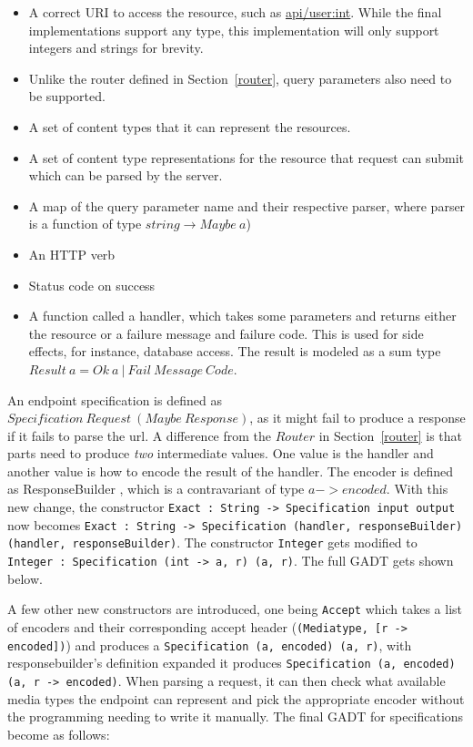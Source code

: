 \begin{itemize}
    \item A correct URI to access the resource, such as \url{api/user:int}.
        While the final implementations support any type, this implementation
        will only support integers and strings for brevity.
    \item Unlike the router defined in Section~\ref{router}, query parameters
        also need to be supported.
    \item A set of content types that it can represent the resources.
    \item A set of content type representations for the resource that request can
        submit which can be parsed by the server.
    \item A map of the query parameter name and their respective parser,
        where parser is a function of type $string \rightarrow Maybe\ a$)
    \item An HTTP verb
    \item Status code on success
    \item A function called a handler, which takes some parameters and returns
        either the resource or a failure message and failure code. This is used
        for side effects, for instance, database access. The result is modeled as
        a sum type $Result\ a = Ok\ a\ |\ Fail\ Message\ Code$.
\end{itemize}

An endpoint specification is defined as $Specification\ Request\ (Maybe\
Response)$, as it might fail to produce a response if it fails to parse the url.
A difference from the $Router$ in Section~\ref{router} is that parts need to
produce \textit{two} intermediate values.  One value is the handler and another
value is how to encode the result of the handler. The encoder is defined as
ResponseBuilder , which is a contravariant of type $a -> encoded$.  With this
new change, the constructor \texttt{Exact : String -> Specification input
output} now becomes \texttt{Exact : String -> Specification (handler,
responseBuilder) (handler, responseBuilder)}. The constructor \texttt{Integer}
gets modified to \texttt{Integer : Specification (int -> a, r) (a, r)}. The full
GADT gets shown below.

A few other new constructors are introduced, one being \texttt{Accept} which
takes a list of encoders and their corresponding accept header
(\texttt{(Mediatype, [r -> encoded])}) and produces a \texttt{Specification (a,
    encoded) (a, r)}, with responsebuilder's definition expanded it produces
    \texttt{Specification (a, encoded) (a, r -> encoded)}. When parsing a
    request, it can then check what available media types the endpoint can
    represent and pick the appropriate encoder without the programming needing
    to write it manually. The final GADT for specifications become as follows:

